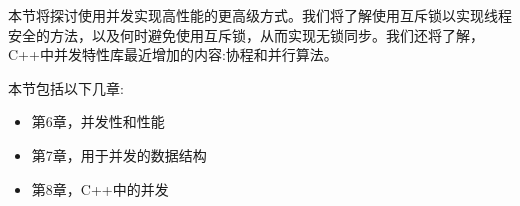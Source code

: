本节将探讨使用并发实现高性能的更高级方式。我们将了解使用互斥锁以实现线程安全的方法，以及何时避免使用互斥锁，从而实现无锁同步。我们还将了解，C++中并发特性库最近增加的内容:协程和并行算法。

本节包括以下几章:

\begin{itemize}
\item 第6章，并发性和性能
\item 第7章，用于并发的数据结构
\item 第8章，C++中的并发
\end{itemize}

